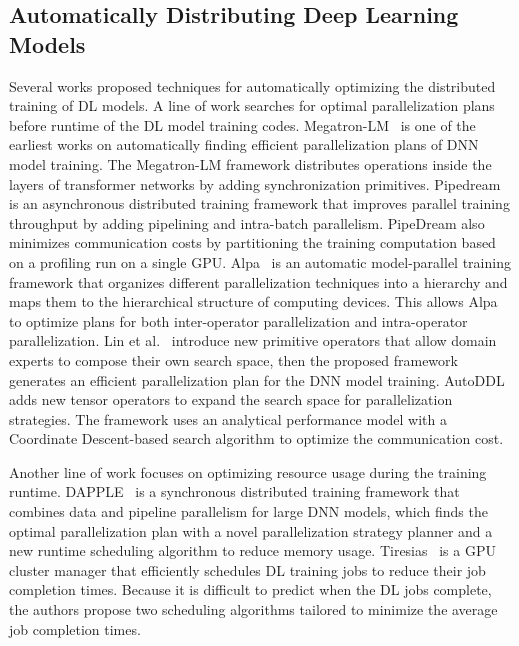 \begin{inred}

\subsection{Automatically Distributing Deep Learning Models}

Several works proposed techniques for automatically optimizing the
distributed training of DL models.
A line of work searches for optimal parallelization plans
before runtime of the DL model training codes.
Megatron-LM~\cite{megatron-lm} is one of the earliest works on automatically 
finding efficient parallelization plans of DNN model training. 
The Megatron-LM framework distributes operations inside the layers of 
transformer networks by adding synchronization primitives.
Pipedream~\cite{pipedream} is an asynchronous distributed training framework 
that improves parallel training throughput by adding pipelining and intra-batch parallelism. 
PipeDream also minimizes communication costs by partitioning the training computation based on a profiling run on a single GPU.
Alpa~\cite{alpa} is an automatic model-parallel training framework that 
organizes different parallelization techniques into a hierarchy 
and maps them to the hierarchical structure of computing devices. 
This allows Alpa to optimize plans for both inter-operator parallelization and intra-operator parallelization.
Lin et al.~\cite{nnscaler} introduce new primitive operators 
that allow domain experts to compose their own search space, 
then the proposed framework generates an efficient parallelization plan for the DNN model training.
AutoDDL~\cite{autoddl} adds new tensor operators to expand the search space for parallelization strategies. 
The framework uses an analytical performance model with a Coordinate Descent-based search algorithm to optimize the communication cost.

Another line of work focuses on optimizing resource usage
during the training runtime. 
DAPPLE~\cite{dapple} is a synchronous distributed training framework 
that combines data and pipeline parallelism for large DNN models, 
which finds the optimal parallelization plan with a novel parallelization strategy planner 
and a new runtime scheduling algorithm to reduce memory usage.
Tiresias~\cite{tiresias} is a GPU cluster manager 
that efficiently schedules DL training jobs to reduce their job completion times. 
Because it is difficult to predict when the DL jobs complete, 
the authors propose two scheduling algorithms tailored to minimize the average job completion times.


\end{inred}
